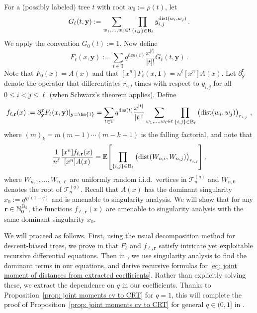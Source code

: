 \documentclass{article}
\theoremstyle{remark}
\newcommand{\bN}{\mathbb{N}}
\newcommand{\bC}{\mathbb{C}}
\newcommand{\bT}{\mathbb{T}}
\newcommand{\abs}[1]{{\left|#1\right|}}
\newcommand{\dist}{\mathrm{dist}}
\newcommand{\pairs}{{\rm B}}
\newcommand{\cT}{\mathcal{T}}
\newcommand{\by}{{\mathbf{y}}}
\newcommand{\br}{{\mathbf{r}}}
\newcommand{\expec}[1]{\mathbb{E}{\left[#1\right]}}
\newcommand{\des}[1]{{\mathrm{des}{\left(#1\right)}}}
\begin{document}
For a (possibly labeled) tree $t$ with root $w_0 := \rho(t)$, let
\[
G_\ell (t,\by) := \sum_{w_1,\dots,w_\ell \in t} \prod_{\{i,j\}\in \pairs_\ell} y_{i,j}^{\dist(w_i,w_j)}\,.
\]
We apply the convention $G_0(t) := 1$.
Now define
\[
F_\ell(x,\by) := \sum_{t\in\bT} q^\des{t} \frac{x^{\abs{t}}}{\abs{t}!} G_\ell(t,\by) \,.
\]
Note that $F_0(x) = A(x)$ and that $[x^n]F_\ell(x,\bm{1}) = n^\ell [x^n] A(x)$.
Let $\partial_\by^\br$ denote the operator that differentiates $r_{i,j}$ times with respect to $y_{i,j}$ for all $0\le i < j\le \ell$ (when Schwarz's theorem applies).
Define
\begin{equation*}
    f_{\ell,\br}(x) := \partial_\by^\br F_\ell(x,\by) \vert_{\by=\bm{1}} 
    = \sum_{t\in \bT} q^\des{t} \frac{x^{\abs{t}}}{\abs{t}!} \sum_{w_1,\dots,w_\ell\in t} \prod_{\{i,j\}\in \pairs_\ell} \left(\big. \dist(w_i,w_j) \right)_{r_{i,j}}\,,
\end{equation*}
where $(m)_k = m(m-1)\cdots(m-k+1)$ is the falling factorial, and note that
\begin{equation}\label{eq: joint moment of distances from extracted coefficients}
    \frac{1}{n^\ell} \frac{[x^n]f_{\ell,\br}(x)}{[x^n]A(x)} 
    = \expec{ \prod_{\{i,j\}\in \pairs_\ell} \left(\big. \dist(W_{n,i},W_{n,j}) \right)_{r_{i,j}} }\,,
\end{equation}
where $W_{n,1}, \dots, W_{n,\ell}$ are uniformly random i.i.d.~vertices in $\cT_n^{(q)}$ and $W_{n,0}$ denotes the root of $\cT_n^{(q)}$. 
Recall that $A(x)$ has the dominant singularity $x_0 := q^{q/(1-q)}$ and is amenable to singularity analysis.
We will show that %
for any $\br \in \bN_0^{\pairs_\ell}$, the functions $f_{\ell,\br}(x)$ are amenable to singularity analysis with the same dominant singularity $x_0$.

We will proceed as follows.
First, using the usual decomposition method for descent-biased trees, we prove in  that $F_{\ell}$ and $f_{\ell,\br}$ satisfy intricate yet exploitable recursive differential equations.
Then in , we use singularity analysis to find the dominant terms in our equations, and derive recursive formulas for \eqref{eq: joint moment of distances from extracted coefficients}.
Rather than explicitly solving these, we extract the dependence on $q$ in our coefficients. 
Thanks to Proposition~\ref{prop: joint moments cv to CRT} for $q=1$, this will complete the proof of Proposition~\ref{prop: joint moments cv to CRT} for general $q\in(0,1]$ in .
\end{document}
